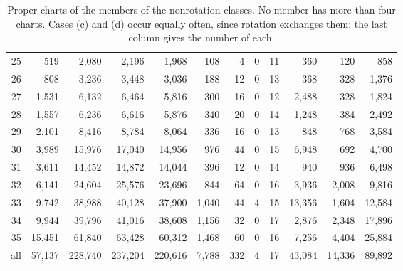 \documentclass[11pt,a4paper]{amsart}
\numberwithin{equation}{section}
\theoremstyle{plain}
\theoremstyle{definition}
\begin{document}
\begin{table}[ht]
\begin{tabular}{rrrrrrrrrrrr}
25 & 519 & 2{,}080 & 2{,}196 & 1{,}968 & 108 & 4 & 0 & 11 & 360 & 120 & 858 \\
26 & 808 & 3{,}236 & 3{,}448 & 3{,}036 & 188 & 12 & 0 & 13 & 368 & 328 & 1{,}376 \\
27 & 1{,}531 & 6{,}132 & 6{,}464 & 5{,}816 & 300 & 16 & 0 & 12 & 2{,}488 & 328 & 1{,}824 \\
28 & 1{,}557 & 6{,}236 & 6{,}616 & 5{,}876 & 340 & 20 & 0 & 14 & 1{,}248 & 384 & 2{,}492 \\
29 & 2{,}101 & 8{,}416 & 8{,}784 & 8{,}064 & 336 & 16 & 0 & 13 & 848 & 768 & 3{,}584 \\
30 & 3{,}989 & 15{,}976 & 17{,}040 & 14{,}956 & 976 & 44 & 0 & 15 & 6{,}948 & 692 & 4{,}700 \\
31 & 3{,}611 & 14{,}452 & 14{,}872 & 14{,}044 & 396 & 12 & 0 & 14 & 940 & 936 & 6{,}498 \\
32 & 6{,}141 & 24{,}604 & 25{,}576 & 23{,}696 & 844 & 64 & 0 & 16 & 3{,}936 & 2{,}008 & 9{,}816 \\
33 & 9{,}742 & 38{,}988 & 40{,}128 & 37{,}900 & 1{,}040 & 44 & 4 & 15 & 13{,}356 & 1{,}604 & 12{,}584 \\
34 & 9{,}944 & 39{,}796 & 41{,}016 & 38{,}608 & 1{,}156 & 32 & 0 & 17 & 2{,}876 & 2{,}348 & 17{,}896 \\
35 & 15{,}451 & 61{,}840 & 63{,}428 & 60{,}312 & 1{,}468 & 60 & 0 & 16 & 7{,}256 & 4{,}404 & 25{,}884 \\
\midrule
all & 57{,}137 & 228{,}740 & 237{,}204 & 220{,}616 & 7{,}788 & 332 & 4 & 17 & 43{,}084 & 14{,}336 & 89{,}892 \\
\bottomrule
\end{tabular}
\par\bigskip
\caption{Proper charts of the members of the nonrotation classes.  No member has more than four charts.  Cases (c) and (d) occur equally often, since rotation exchanges them; the last column gives the number of each.}
\label{tab:roots}
\end{table}
\end{document}

